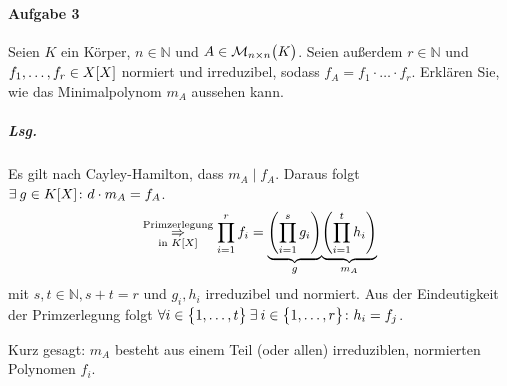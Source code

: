 \documentclass{scrreprt}
\begin{document}
\paragraph{Aufgabe 3} Seien $K$ ein Körper, $n \in \mathbb{N}$ und
$A \in \mathcal{M}_{n \times n}\qty\big(K)$.
Seien außerdem $r \in \mathbb{N}$ und $f_1, \ldots, f_r \in X\qty[X]$
normiert und irreduzibel, sodass $f_A = f_1 \cdot \ldots \cdot f_r$.
Erklären Sie, wie das Minimalpolynom $m_A$ aussehen kann.
\subparagraph{Lsg.} Es gilt nach Cayley-Hamilton, dass $m_A \mid f_A$.
Daraus folgt $\exists \: g \in K\qty[X] \colon d \cdot m_A = f_A$.
\[
  \overset{\text{Primzerlegung}}{
    \underset{\text{in }K\qty[X]}\Rightarrow
  } \prod_{i = 1}^r f_i = \underset{g}{\underbrace{\qty(
    \prod_{i = 1}^s g_i
  )}}\underset{m_A}{\underbrace{\qty(
    \prod_{i = 1}^t h_i
  )}}
\]
mit $s, t \in \mathbb{N}, s + t = r$ und $g_i, h_i$ irreduzibel und normiert.
Aus der Eindeutigkeit der Primzerlegung folgt
$\forall i \in \qty\big{1, \ldots, t} \: \exists \: i \in \qty\big{1, \ldots, r}
\colon h_i = f_j$.

Kurz gesagt: $m_A$ besteht aus einem Teil (oder allen) irreduziblen, normierten
Polynomen $f_i$.
\end{document}
